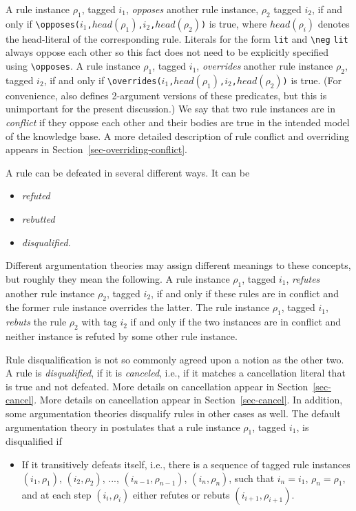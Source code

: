 \documentclass[11pt]{article}
\newcommand{\ERGO}{\mbox{\smaller{\ensuremath{\cal{E}}\smaller{{\sc{RGO}}}}}\xspace}
\newcommand{\FLSYSTEM}{\ERGO}
\newcommand{\bs}{\textbackslash}
\newcommand{\RULELOGNEG}{{\texttt{{\bs}neg}}\xspace}
\begin{document}
A rule instance $\rho_1$, tagged $i_1$, \emph{opposes} another rule
instance, $\rho_2$ tagged $i_2$, if and only if
\texttt{\bs{}opposes($i_1$,$head(\rho_1)$,$i_2$,$head(\rho_2)$)} is true,
where $head(\rho_i)$ denotes the head-literal of the corresponding rule.
Literals for the form \texttt{lit} and \texttt{\RULELOGNEG}  \texttt{lit} always oppose 
each other so this fact does not need to be explicitly specified using
\texttt{\bs{}opposes}.   
A rule instance $\rho_1$, tagged
$i_1$, \emph{overrides} another rule instance $\rho_2$, tagged $i_2$, if and
only if \texttt{\bs{}overrides($i_1$,$head(\rho_1)$,$i_2$,$head(\rho_2)$)} is
true. (For convenience, \FLSYSTEM also defines 2-argument versions of these
predicates, but this is unimportant for the present discussion.)
We say that two rule instances are in \emph{conflict} if they oppose each other
and their bodies are true in the intended model of the knowledge base.
A more detailed description of rule conflict and overriding appears in
Section~\ref{sec-overriding-conflict}.

A rule can be defeated in several different ways. It can be
\begin{itemize}
\item  \emph{refuted}
\item  \emph{rebutted} 
\item  \emph{disqualified}. 
\end{itemize}
Different argumentation theories may assign different meanings to these
concepts, but roughly they mean the following. A rule instance $\rho_1$,
tagged $i_1$, \emph{refutes} another rule instance $\rho_2$, tagged $i_2$, 
if and only if these rules are in conflict and the former rule instance
overrides the latter. The rule instance $\rho_1$,
tagged $i_1$, \emph{rebuts} the rule $\rho_2$ with tag $i_2$ if and only if the two
instances are in conflict and neither instance is refuted by some other
rule instance.

Rule disqualification is not so commonly agreed upon a notion as the other
two.  A rule is \emph{disqualified}, if it is \emph{canceled}, i.e., 
if it matches a
cancellation literal that is true and not defeated. More details on
cancellation appear in Section~\ref{sec-cancel}. More details on
cancellation appear in Section~\ref{sec-cancel}. In addition, some
argumentation theories disqualify rules in other cases as well.
The default argumentation theory in \FLSYSTEM postulates that a
rule instance $\rho_1$, tagged $i_1$, is disqualified if
\begin{itemize}
\item If it transitively defeats itself, i.e., there is a sequence of
  tagged rule instances $(i_1,\rho_1)$, $(i_2,\rho_2)$, ...,
  $(i_{n-1},\rho_{n-1})$, $(i_n,\rho_n)$, such that $i_n=i_1$,
  $\rho_n=\rho_1$, and at each step $(i_i,\rho_i)$ either refutes or rebuts
  $(i_{i+1},\rho_{i+1})$.
\end{itemize}
\end{document}

